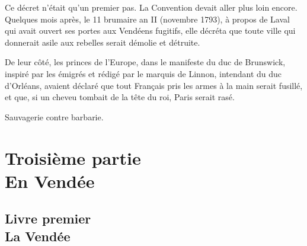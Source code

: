 \documentclass[french,twoside]{book} %
\begin{document}
Ce décret n’était qu’un premier pas. La Convention devait aller plus loin encore. Quelques mois après, le 11 brumaire an II (novembre 1793), à propos de Laval qui avait ouvert ses portes aux Vendéens fugitifs, elle décréta que toute ville qui donnerait asile aux rebelles serait démolie et détruite.\par
De leur côté, les princes de l’Europe, dans le manifeste du duc de Brunswick, inspiré par les émigrés et rédigé par le marquis de Linnon, intendant du duc d’Orléans, avaient déclaré que tout Français pris les armes à la main serait fusillé, et que, si un cheveu tombait de la tête du roi, Paris serait rasé.\par
Sauvagerie contre barbarie.\par
  \section[{Troisième partie. En Vendée}]{Troisième partie \\
En Vendée}
\label{p3}\renewcommand{\leftmark}{Troisième partie \\
En Vendée}

  \subsection[{Livre premier. La Vendée}]{Livre premier \\
La Vendée}
\label{p3l1}
\end{document}
